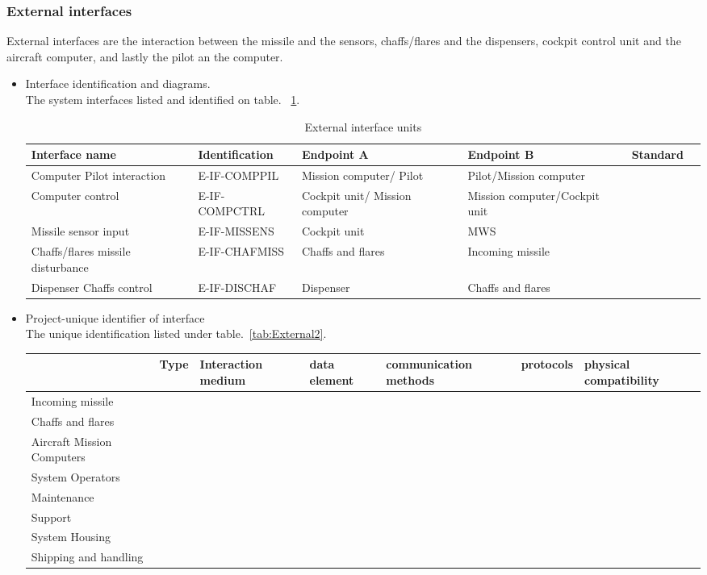 \subsubsection{External interfaces}
External interfaces are the interaction between the missile and the sensors, chaffs/flares and the dispensers, cockpit control unit and the aircraft computer, and lastly the pilot an the computer.
\begin{itemize}
\item {Interface identification and diagrams.}\\
The system interfaces listed and identified on table. ~\ref{tab:External}.


\begin{center}
\begin{table}[h]
\caption{External interface units}
\label{tab:External}
\begin{tabular}{ | p{2cm} | l | p{2.3cm} | p{2.3cm} | l | p{1cm} |}
\hline
 \textbf{Interface name} & \textbf{Identification} & \textbf{Endpoint A} & \textbf{Endpoint B} & \textbf{Standard}\\ \hline
Computer Pilot interaction & E-IF-COMPPIL & Mission computer/ Pilot & Pilot/Mission computer & \\ \hline
 Computer control & E-IF-COMPCTRL & Cockpit unit/ Mission computer &Mission computer/Cockpit unit & \\ \hline
Missile sensor input & E-IF-MISSENS & Cockpit unit & MWS & \\ \hline
Chaffs/flares missile disturbance& E-IF-CHAFMISS & Chaffs and flares & Incoming missile & \\ \hline
Dispenser Chaffs control & E-IF-DISCHAF & Dispenser & Chaffs and flares & \\ \hline
\end{tabular}
\end{table}
\end{center}

\item {Project-unique identifier of interface}\\
The unique identification listed under table.~\ref{tab:External2}. 
\begin{sidewaystable}[h]
\caption{External Interface Elements}
\label{tab:External2}
\begin{tabular}{ l l l l l l l }
\hline
&Type&Interaction medium&data element&communication methods&protocols&physical compatibility\\
\hline
Incoming missile&&&&&&\\
\hline
Chaffs and flares&&&&&&\\
\hline
Aircraft Mission Computers&&&&&&\\
\hline
System Operators&&&&&&\\
\hline
Maintenance&&&&&&\\
\hline
Support&&&&&&\\
\hline
System Housing&&&&&&\\
\hline
Shipping and handling&&&&&&\\
\hline
\end{tabular}
\end{sidewaystable}
\end{itemize}
